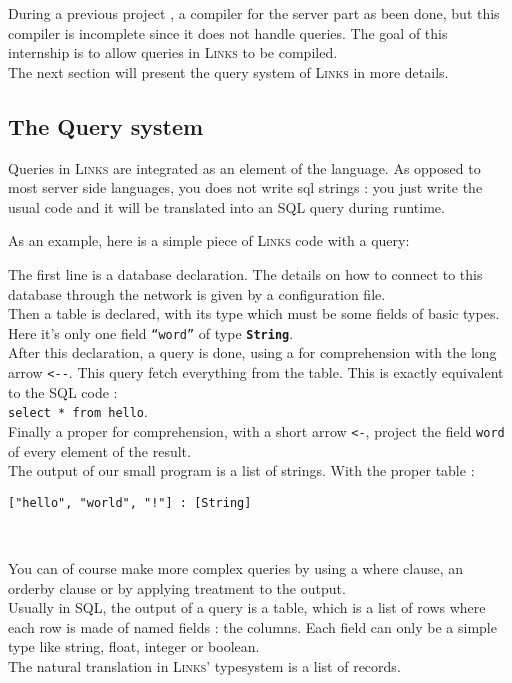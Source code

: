 \documentclass[11pt]{article}
\newcommand\mysc[1]{{\rmfamily\textsc{#1}}\xspace}
\newcommand\links{\mysc{Links}}
\newcommand\sql{\mysc{SQL}}
\newcommand\sig[1]{{\tt\bf #1}}
\newcommand\code[1]{{\tt #1}}
\newcommand\linkslst[1]{}
\begin{document}
During a previous project \cite{links:comp}, a compiler for the server part as been done, but this compiler is incomplete since it does not handle queries. The goal of this internship is to allow queries in \links to be compiled.\\

The next section will present the query system of \links in more details.

\subsection{The Query system\label{intro:query}}

Queries in \links are integrated as an element of the language. As opposed to most server side languages, you does not write sql strings : you just write the usual code and it will be translated into an \sql query during runtime.

As an example, here is a simple piece of \links code with a query: 
\linkslst{simplequery.links}
The first line is a database declaration. The details on how to connect to this database through the network is given by a configuration file.\\
Then a table is declared, with its type which must be some fields of basic types. Here it's only one field \code{``word''} of type \sig{String}.\\
After this declaration, a query is done, using a for comprehension with the long arrow \code{<-\--}. This query fetch everything from the table. This is exactly equivalent to the \sql code :\\ \verb+select * from hello+.\\
 Finally a proper for comprehension, with a short arrow \code{<-}, project the field \code{word} of every element of the result.\\
The output of our small program is a list of strings. With the proper table :
\begin{lstlisting}
["hello", "world", "!"] : [String]
\end{lstlisting}\ 

You can of course make more complex queries by using a where clause, an orderby clause or by applying treatment to the output.\\

Usually in \sql, the output of a query is a table, which is a list of rows where each row is made of named fields : the columns. Each field can only be a simple type like string, float, integer or boolean.\\
The natural translation in \links' typesystem is a list of records.\\
\end{document}
